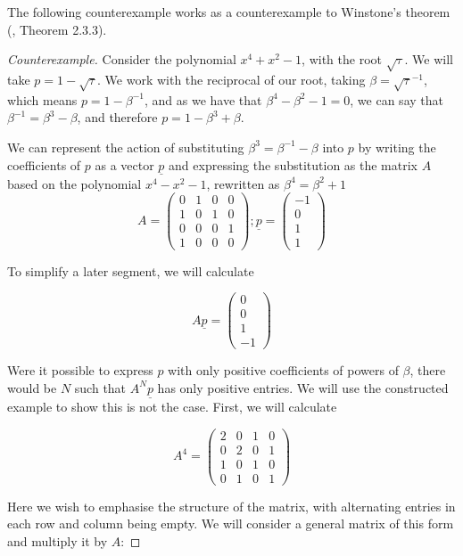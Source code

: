 \documentclass[
11pt, %
english, %
singlespacing, %
parskip, %
headsepline, %
]{amsart} %
\theoremstyle{definition}
\begin{document}
The following counterexample works as a counterexample to Winstone's theorem (\cite{Winstone}, Theorem 2.3.3).

\begin{proof}[Counterexample]
Consider the polynomial $x^4+x^2-1$, with the root $\sqrt{\tau}$. We will take $p=1-\sqrt{\tau}$. We work with the reciprocal of our root, taking $\beta = \sqrt{\tau}^{-1}$, which means $p=1-\beta^{-1}$, and as we have that $\beta^4-\beta^2-1=0$, we can say that $\beta^{-1}=\beta^3 -\beta$, and therefore $p=1-\beta^3+\beta$.
\par
We can represent the action of substituting $\beta^3 = \beta^{-1} - \beta$ into $p$  by writing the coefficients of $p$ as a vector $\underline{p}$ and expressing the substitution as the matrix $A$ based on the polynomial $x^4-x^2-1$, rewritten as $\beta^4 = \beta^2 + 1$
$$
A =
\begin{pmatrix}
0 & 1 & 0 & 0 \\
1 & 0 & 1 & 0 \\
0 & 0 & 0 & 1 \\
1 & 0 & 0 & 0
\end{pmatrix}
; \underline{p} = 
\begin{pmatrix}
-1 \\ 0 \\ 1 \\ 1
\end{pmatrix}
$$

To simplify a later segment, we will calculate 

$$A \underline{p} = \begin{pmatrix} 0 \\ 0 \\ 1 \\ -1 \end{pmatrix}$$

Were it possible to express $p$ with only positive coefficients of powers of $\beta$, there would be $N$ such that $A^N \underline{p}$ has only positive entries. We will use the constructed example to show this is not the case. First, we will calculate 

$$
A^4 =
\begin{pmatrix}
2 & 0 & 1 & 0 \\
0 & 2 & 0 & 1 \\
1 & 0 & 1 & 0 \\
0 & 1 & 0 & 1 
\end{pmatrix}
$$

Here we wish to emphasise the structure of the matrix, with alternating entries in each row and column being empty. We will consider a general matrix of this form and multiply it by $A$:



\end{proof}
\end{document}
